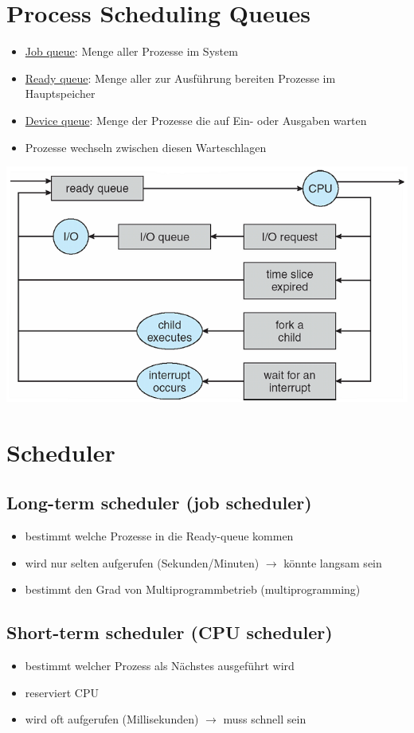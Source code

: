 \documentclass[a4paper]{scrreprt}
\begin{document}
\section{Process Scheduling Queues}
\begin{itemize}
\item \underline{Job queue}: Menge aller Prozesse im System
\item \underline{Ready queue}: Menge aller zur Ausführung bereiten Prozesse im Hauptspeicher
\item \underline{Device queue}: Menge der Prozesse die auf Ein- oder Ausgaben warten
\item Prozesse wechseln zwischen diesen Warteschlagen
\end{itemize}
\includegraphics[scale = 0.5]{graphics/queues.png}
\section{Scheduler}
\subsection{Long-term scheduler (job scheduler)}
\begin{itemize}
\item bestimmt welche Prozesse in die Ready-queue kommen
\item wird nur selten aufgerufen (Sekunden/Minuten) $\rightarrow$ könnte langsam sein
\item bestimmt den Grad von Multiprogrammbetrieb (multiprogramming)
\end{itemize}
\subsection{Short-term scheduler (CPU scheduler)}
\begin{itemize}
\item bestimmt welcher Prozess als Nächstes ausgeführt wird
\item reserviert CPU
\item wird oft aufgerufen (Millisekunden) $\rightarrow$ muss schnell sein
\end{itemize}
\end{document}
